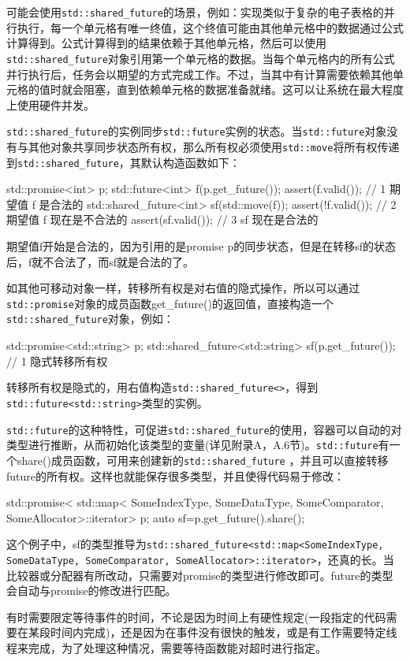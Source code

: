 可能会使用\texttt{std::shared\_future}的场景，例如：实现类似于复杂的电子表格的并行执行，每一个单元格有唯一终值，这个终值可能由其他单元格中的数据通过公式计算得到。公式计算得到的结果依赖于其他单元格，然后可以使用\texttt{std::shared\_future}对象引用第一个单元格的数据。当每个单元格内的所有公式并行执行后，任务会以期望的方式完成工作。不过，当其中有计算需要依赖其他单元格的值时就会阻塞，直到依赖单元格的数据准备就绪。这可以让系统在最大程度上使用硬件并发。

\texttt{std::shared\_future}的实例同步\texttt{std::future}实例的状态。当\texttt{std::future}对象没有与其他对象共享同步状态所有权，那么所有权必须使用\texttt{std::move}将所有权传递到\texttt{std::shared\_future}，其默认构造函数如下：

\begin{cpp}
std::promise<int> p;
std::future<int> f(p.get_future());
assert(f.valid());  // 1 期望值 f 是合法的
std::shared_future<int> sf(std::move(f));
assert(!f.valid());  // 2 期望值 f 现在是不合法的
assert(sf.valid());  // 3 sf 现在是合法的
\end{cpp}

期望值f开始是合法的，因为引用的是promise p的同步状态，但是在转移sf的状态后，f就不合法了，而sf就是合法的了。

如其他可移动对象一样，转移所有权是对右值的隐式操作，所以可以通过\texttt{std::promise}对象的成员函数get\_future()的返回值，直接构造一个\texttt{std::shared\_future}对象，例如：

\begin{cpp}
std::promise<std::string> p;
std::shared_future<std::string> sf(p.get_future());  // 1 隐式转移所有权
\end{cpp}

转移所有权是隐式的，用右值构造\texttt{std::shared\_future<>}，得到\texttt{std::future<std::string>}类型的实例。

\texttt{std::future}的这种特性，可促进\texttt{std::shared\_future}的使用，容器可以自动的对类型进行推断，从而初始化该类型的变量(详见附录A，A.6节)。\texttt{std::future}有一个share()成员函数，可用来创建新的\texttt{std::shared\_future} ，并且可以直接转移future的所有权。这样也就能保存很多类型，并且使得代码易于修改：

\begin{cpp}
std::promise< std::map< SomeIndexType, SomeDataType, SomeComparator,
     SomeAllocator>::iterator> p;
auto sf=p.get_future().share();
\end{cpp}

这个例子中，sf的类型推导为\texttt{std::shared\_future<std::map<SomeIndexType, SomeDataType, SomeComparator, SomeAllocator>::iterator>}，还真的长。当比较器或分配器有所改动，只需要对promise的类型进行修改即可。future的类型会自动与promise的修改进行匹配。

有时需要限定等待事件的时间，不论是因为时间上有硬性规定(一段指定的代码需要在某段时间内完成)，还是因为在事件没有很快的触发，或是有工作需要特定线程来完成，为了处理这种情况，需要等待函数能对超时进行指定。

